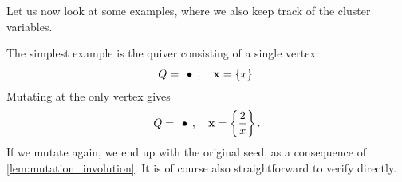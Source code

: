 Let us now look at some examples, where we also keep track of the cluster variables.
\begin{example}
	The simplest example is the quiver consisting of a single vertex:
	\begin{equation*}
		Q = \begin{tikzcd}
			\bullet
		\end{tikzcd},
		\quad \bx = \{x\}.
	\end{equation*}
	Mutating at the only vertex gives
	\begin{equation*}
		Q = \begin{tikzcd}
			\bullet
		\end{tikzcd},
		\quad \bx = \left\{\frac{2}{x}\right\}.
	\end{equation*}
	If we mutate again, we end up with the original seed, as a consequence of
	\cref{lem:mutation_involution}. It is of course also straightforward to verify
	directly.
\end{example}

